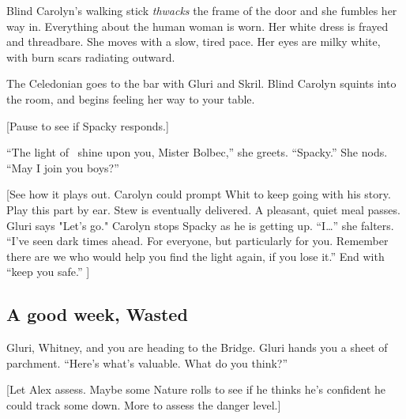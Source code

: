 \begin{multicols}{2}
\begin{aloud}
    Blind Carolyn's walking stick \emph{thwacks} the frame of the door and she fumbles her way in.
    Everything about the human woman is worn.
    Her white dress is frayed and threadbare.
    She moves with a slow, tired pace.
    Her eyes are milky white, with burn scars radiating outward.

    The Celedonian goes to the bar with Gluri and Skril.
    Blind Carolyn squints into the room, and begins feeling her way to your table.
  \end{aloud}

  [Pause to see if Spacky responds.]

  ``The light of \Enyhito\ shine upon you, Mister Bolbec,'' she greets.
  ``Spacky.'' She nods.
  ``May I join you boys?''

  [See how it plays out.
   Carolyn could prompt Whit to keep going with his story.
   Play this part by ear.
   Stew is eventually delivered.
   A pleasant, quiet meal passes.
   Gluri says "Let's go."
   Carolyn stops Spacky as he is getting up.
   ``I\ldots'' she falters.
   ``I've seen dark times ahead.
     For everyone, but particularly for you.
     Remember there are we who would help you find the light again, if you lose it.''
  End with ``\Enyhito keep you safe.''
  ]

  \subsection{A good week, Wasted}
  Gluri, Whitney, and you are heading to the Bridge.
  Gluri hands you a sheet of parchment.
  ``Here's what's valuable.
    What do you think?''

  [Let Alex assess.
   Maybe some Nature rolls to see if he thinks he's confident he could track some down.
   More to assess the danger level.]


\end{multicols}
